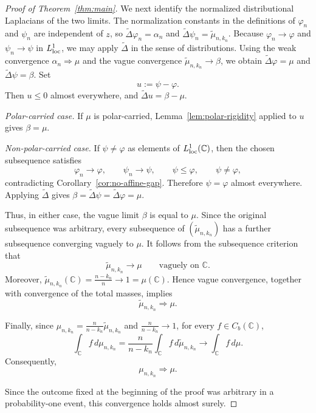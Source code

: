 \documentclass[10pt,reqno]{amsart}
\theoremstyle{remark}
\newcommand{\C}{\mathbb C}
\newcommand{\weak}{\Rightarrow}
\begin{document}
\begin{proof}[Proof of Theorem~\ref{thm:main}]
    We next identify the normalized distributional Laplacians of the two limits. The normalization constants in the definitions of $\varphi_n$ and $\psi_n$ are independent of $z$, so $\widetilde{\Delta}\varphi_n=\alpha_n$ and $\widetilde{\Delta}\psi_n=\tilde\mu_{n,k_n}$. Because $\varphi_n\to \varphi$ and $\psi_n\to \psi$ in $L_{\rm loc}^1$, we may apply $\widetilde{\Delta}$ in the sense of distributions. Using the weak convergence $\alpha_n\weak \mu$ and the vague convergence $\tilde\mu_{n,k_n}\to \beta$, we obtain $\widetilde{\Delta}\varphi=\mu$ and $\widetilde{\Delta}\psi=\beta$. 
    Set
    \[u:=\psi-\varphi.\]
    Then $u\le 0$ almost everywhere, and $\widetilde{\Delta}u=\beta-\mu$.

    \medskip
    \noindent
    \emph{Polar-carried case.}
    If $\mu$ is polar-carried, Lemma~\ref{lem:polar-rigidity} applied to $u$ gives $\beta=\mu$.

    \medskip
    \noindent
    \emph{Non-polar-carried case.}
    If $\psi\neq \varphi$ as elements of $L_{\rm loc}^1(\C)$, then the chosen subsequence satisfies
    \[\varphi_n\to \varphi,\qquad \psi_n\to \psi, \qquad \psi\le \varphi,\qquad \psi\neq \varphi,\]
    contradicting Corollary~\ref{cor:no-affine-gap}. Therefore $\psi=\varphi$ almost everywhere. Applying $\widetilde{\Delta}$ gives $\beta=\widetilde{\Delta}\psi=\widetilde{\Delta}\varphi=\mu$. 
    
    Thus, in either case, the vague limit $\beta$ is equal to $\mu$. Since the original subsequence was arbitrary, every subsequence of $(\tilde\mu_{n,k_n})$ has a further subsequence converging vaguely to $\mu$. It follows from the subsequence criterion that
    \[\tilde\mu_{n,k_n}\to\mu \qquad\text{vaguely on }\C.\]
    Moreover, $\tilde\mu_{n,k_n}(\C)=\frac{n-k_n}{n}\to 1=\mu(\C)$. Hence vague convergence, together with convergence of the total masses, implies
    \[\tilde\mu_{n,k_n}\weak\mu.\]
    
    Finally, since $\mu_{n,k_n}=\frac{n}{n-k_n}\tilde\mu_{n,k_n}$ and $\frac{n}{n-k_n}\to 1$, for every $f\in C_b(\C)$,
    \[\int_\C f\,d\mu_{n,k_n}=
    \frac{n}{n-k_n}\int_\C f\,d\tilde\mu_{n,k_n}\to
    \int_\C f\,d\mu.\]
    Consequently,
    \[\mu_{n,k_n}\weak\mu.\]
    
    Since the outcome fixed at the beginning of the proof was arbitrary in a probability-one event, this convergence holds almost surely.

\end{proof}
\end{document}
